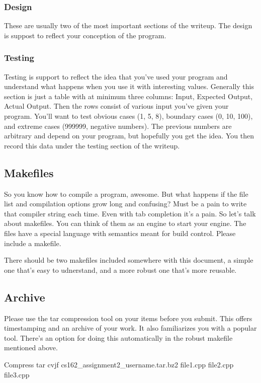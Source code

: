 \documentclass[letterpaper,10pt,titlepage,fleqn]{article}
\begin{document}
\subsubsection{Design}
These are usually two of the most important sections of the writeup. The design
is suppost to reflect your conception of the program.

\subsubsection{Testing}
Testing is support to reflect the idea that you've used your program and
understand what happens when you use it with interesting values. Generally this
section is just a table with at minimum three columns: Input, Expected Output,
Actual Output. Then the rows consist of various input you've given your program.
You'll want to test obvious cases (1, 5, 8), boundary cases (0, 10, 100), and
extreme cases (999999, negative numbers). The previous numbers are arbitrary and
depend on your program, but hopefully you get the idea. You then record this
data under the testing section of the writeup.


\subsection{Makefiles}
So you know how to compile a program, awesome. But what happens if the file list and compilation options grow long and confusing? Must be a pain to write that compiler string each time. Even with tab completion it’s a pain. So let’s talk about makefiles. You can think of them as an engine to start your engine. The files have a special language with semantics meant for build control. Please include a makefile.

There should be two makefiles included somewhere with this document, a simple
one that's easy to udnerstand, and a more robust one that's more reusable.  


\subsection{Archive}
Please use the tar compression tool on your items before you submit. This offers timestamping and an archive of your work. It also familiarizes you with a popular tool. There’s an option for doing this automatically in the robust makefile mentioned above.

Compress
tar cvjf cs162\_assignment2\_username.tar.bz2 file1.cpp file2.cpp file3.cpp
\end{document}
